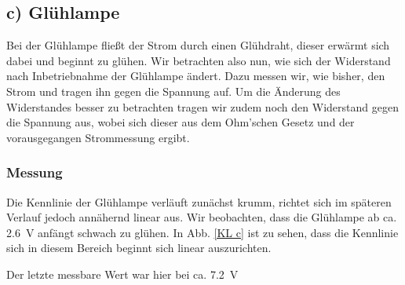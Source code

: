 \documentclass[11pt,a4paper,titlepage, ngerman]{article}
\begin{document}
		\subsection{c) Glühlampe} 
			
			Bei der Glühlampe fließt der Strom durch einen Glühdraht, dieser erwärmt sich dabei und beginnt zu glühen. Wir betrachten also nun, wie sich der Widerstand nach Inbetriebnahme der Glühlampe ändert. Dazu messen wir, wie bisher, den Strom und tragen ihn gegen die Spannung auf. Um die Änderung des Widerstandes besser zu betrachten tragen wir zudem noch den Widerstand gegen die Spannung aus, wobei sich dieser aus dem Ohm'schen Gesetz und der vorausgegangen Strommessung ergibt.  
			
			\subsubsection*{Messung}
				
				Die Kennlinie der Glühlampe verläuft zunächst krumm, richtet sich im späteren Verlauf jedoch annähernd linear aus. Wir beobachten, dass die Glühlampe ab ca. \SI{2.6}{\V} anfängt schwach zu glühen. In Abb. \ref{KL c} ist zu sehen, dass die Kennlinie sich in diesem Bereich beginnt sich linear auszurichten.
				
				Der letzte messbare Wert war hier bei ca. \SI{7.2}{\V}
				
\end{document}
